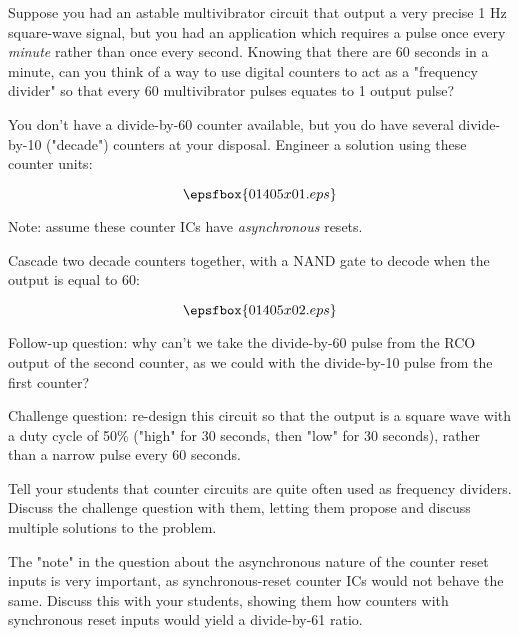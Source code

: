 

Suppose you had an astable multivibrator circuit that output a very precise 1 Hz square-wave signal, but you had an application which requires a pulse once every {\it minute} rather than once every second.  Knowing that there are 60 seconds in a minute, can you think of a way to use digital counters to act as a "frequency divider" so that every 60 multivibrator pulses equates to 1 output pulse?

You don't have a divide-by-60 counter available, but you do have several divide-by-10 ("decade") counters at your disposal.  Engineer a solution using these counter units:

$$\epsfbox{01405x01.eps}$$

Note: assume these counter ICs have {\it asynchronous} resets.







Cascade two decade counters together, with a NAND gate to decode when the output is equal to 60:

$$\epsfbox{01405x02.eps}$$

\vskip 10pt

Follow-up question: why can't we take the divide-by-60 pulse from the RCO output of the second counter, as we could with the divide-by-10 pulse from the first counter?

\vskip 10pt

Challenge question: re-design this circuit so that the output is a square wave with a duty cycle of 50\% ("high" for 30 seconds, then "low" for 30 seconds), rather than a narrow pulse every 60 seconds.







Tell your students that counter circuits are quite often used as frequency dividers.  Discuss the challenge question with them, letting them propose and discuss multiple solutions to the problem.

The "note" in the question about the asynchronous nature of the counter reset inputs is very important, as synchronous-reset counter ICs would not behave the same.  Discuss this with your students, showing them how counters with synchronous reset inputs would yield a divide-by-61 ratio.

